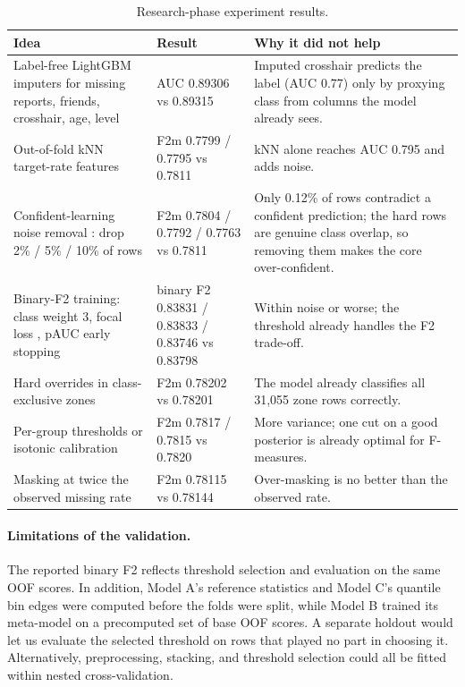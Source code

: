 \documentclass[../main.tex]{subfiles}
\begin{document}
\begin{table}[H]\centering\small
\begin{tabular}{@{}L{.27\linewidth}L{.33\linewidth}L{.32\linewidth}@{}}
\toprule
\textbf{Idea} & \textbf{Result} & \textbf{Why it did not help} \\
\midrule
Label-free LightGBM imputers for missing reports, friends, crosshair, age, level & AUC 0.89306 vs 0.89315 & Imputed crosshair predicts the label (AUC 0.77) only by proxying class from columns the model already sees. \\
Out-of-fold kNN target-rate features & F2m 0.7799 / 0.7795 vs 0.7811 & kNN alone reaches AUC 0.795 and adds noise. \\
Confident-learning noise removal \citep{noisylabels}: drop 2\% / 5\% / 10\% of rows & F2m 0.7804 / 0.7792 / 0.7763 vs 0.7811 & Only 0.12\% of rows contradict a confident prediction; the hard rows are genuine class overlap, so removing them makes the core over-confident. \\
Binary-F2 training: class weight 3, focal loss \citep{focal}, pAUC early stopping & binary F2 0.83831 / 0.83833 / 0.83746 vs 0.83798 & Within noise or worse; the threshold already handles the F2 trade-off. \\
Hard overrides in class-exclusive zones & F2m 0.78202 vs 0.78201 & The model already classifies all 31,055 zone rows correctly. \\
Per-group thresholds or isotonic calibration & F2m 0.7817 / 0.7815 vs 0.7820 & More variance; one cut on a good posterior is already optimal for F-measures. \\
Masking at twice the observed missing rate & F2m 0.78115 vs 0.78144 & Over-masking is no better than the observed rate. \\
\bottomrule
\end{tabular}
\caption{Research-phase experiment results.}\label{tab:t1-failed}
\end{table}

\paragraph{Limitations of the validation.} The reported binary F2 reflects threshold selection and evaluation on the same OOF scores. In addition, Model A's reference statistics and Model C's quantile bin edges were computed before the folds were split, while Model B trained its meta-model on a precomputed set of base OOF scores. A separate holdout would let us evaluate the selected threshold on rows that played no part in choosing it. Alternatively, preprocessing, stacking, and threshold selection could all be fitted within nested cross-validation.
\end{document}
